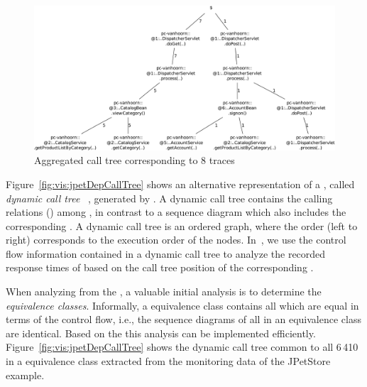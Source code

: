 \begin{figure}\centering
\includegraphics[width=\columnwidth]{figures/20090710-163529-jpetstore-250Threads-400sDuration-200sRampup--20100428-aggregatedCallTree}
\caption{Aggregated call tree corresponding to 8 traces%
}
\label{fig:vis:jpetDepAggregatedCallTree}
\end{figure}

Figure~\ref{fig:vis:jpetDepCallTree} shows an alternative representation of %
a \trace{}, called \textit{dynamic call tree}%
~\citep{AmmonsBallLarus97ExploitingHardwarePerformanceCountersWithFlowAndContextSensitiveProfiling}, generated by \KiekerTpan{}. A dynamic call tree %
contains the calling relations (\callMessages{}) among \operations{}, in contrast %
to a sequence diagram which also includes the corresponding \returnMessages{}. A dynamic call tree is an ordered graph, where the order (left to right) corresponds to the execution order of the nodes.
In~\citep{RohrvanHoornGieseckeMatevskaHasselbringAlekseev2008TraceContextSensitivePerformanceProfilingForEnterpriseSoftwareApplications}, %
we use the control flow information contained in a dynamic call tree to %
analyze the recorded response times of \operations{} based on the call tree position of the %
corresponding \executions{}.

When analyzing \traces{} from the \MonitoringLog{}, a valuable initial analysis %
is to determine the \trace{} \textit{equivalence classes}. %
Informally, a \trace{} equivalence class contains all \traces{} which are equal %
in terms of the control flow, i.e., the sequence diagrams of all \traces{} in an 
equivalence class are identical. %
Based on the \messageTraces{} this analysis can be implemented efficiently. %
Figure~\ref{fig:vis:jpetDepCallTree} shows the dynamic call tree common to all 6\,410~\traces{} %
in a \trace{} equivalence class extracted from the monitoring data of the JPetStore example. %

